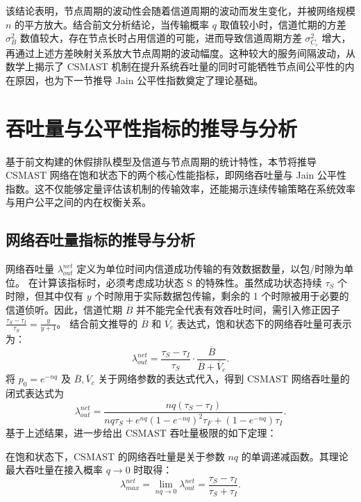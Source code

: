该结论表明，节点周期的波动性会随着信道周期的波动而发生变化，并被网络规模 $n$ 的平方放大。结合前文分析结论，当传输概率 $q$ 取值较小时，信道忙期的方差 $\sigma^2_B$ 数值较大，存在节点长时占用信道的可能，进而导致信道周期方差 $\sigma^2_{C_c}$ 增大，再通过上述方差映射关系放大节点周期的波动幅度。这种较大的服务间隔波动，从数学上揭示了 CSMAST 机制在提升系统吞吐量的同时可能牺牲节点间公平性的内在原因，也为下一节推导 Jain 公平性指数奠定了理论基础。


\section{吞吐量与公平性指标的推导与分析}
\label{sec:csmast_performance}

基于前文构建的休假排队模型及信道与节点周期的统计特性，本节将推导 CSMAST 网络在饱和状态下的两个核心性能指标，即网络吞吐量与 Jain 公平性指数。这不仅能够定量评估该机制的传输效率，还能揭示连续传输策略在系统效率与用户公平之间的内在权衡关系。

\subsection{网络吞吐量指标的推导与分析}

网络吞吐量 $\lambda^{net}_{out}$ 定义为单位时间内信道成功传输的有效数据数量，以包/时隙为单位。
在计算该指标时，必须考虑成功状态 S 的特殊性。虽然成功状态持续 $\tau_S$ 个时隙，但其中仅有 $y$ 个时隙用于实际数据包传输，剩余的 1 个时隙被用于必要的信道侦听。因此，信道忙期 $\overline{B}$ 并不能完全代表有效吞吐时间，需引入修正因子 $\frac{\tau_S - \tau_I}{\tau_S} = \frac{y}{y+1}$。
结合前文推导的 $\overline{B}$ 和 $\overline{V}_c$ 表达式，饱和状态下的网络吞吐量可表示为：
\begin{equation}
	\lambda^{net}_{out} = \frac{\tau_S - \tau_I}{\tau_S} \cdot \frac{\overline{B}}{\overline{B} + \overline{V}_c}.
\end{equation}
将 $p_0 = e^{-nq}$ 及 $\overline{B}, \overline{V}_c$ 关于网络参数的表达式代入，得到 CSMAST 网络吞吐量的闭式表达式为
\begin{equation}
	\label{eq:throughput_csmast}
	\lambda^{net}_{out} = \frac{nq(\tau_S - \tau_I)}{nq\tau_S + e^{nq}(1 - e^{-nq})^2 \tau_F + (1 - e^{-nq})\tau_I}.
\end{equation}
基于上述结果，进一步给出 CSMAST 吞吐量极限的如下定理：

\begin{theorem}
	\label{thm:csmast_max_throughput}
	在饱和状态下，CSMAST 的网络吞吐量是关于参数 $nq$ 的单调递减函数。其理论最大吞吐量在接入概率 $q \to 0$ 时取得：
	\begin{equation}
		\lambda_{max}^{net} = \lim_{nq \to 0} \lambda^{net}_{out} = \frac{\tau_S - \tau_I}{\tau_S + \tau_I}.
	\end{equation}
\end{theorem}

